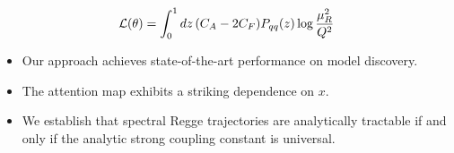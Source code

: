 \begin{equation}
  \mathcal{L}(\theta) = \int_0^1 dz \, (C_A - 2C_F) P_{qq}(z) \log\frac{\mu_R^2}{Q^2}
  \label{eq:4}
\end{equation}

\begin{itemize}
  \item Our approach achieves state-of-the-art performance on model discovery.
  \item The attention map exhibits a striking dependence on $x$.
  \item We establish that spectral Regge trajectories are analytically tractable if and only if the analytic strong coupling constant is universal.
\end{itemize}

